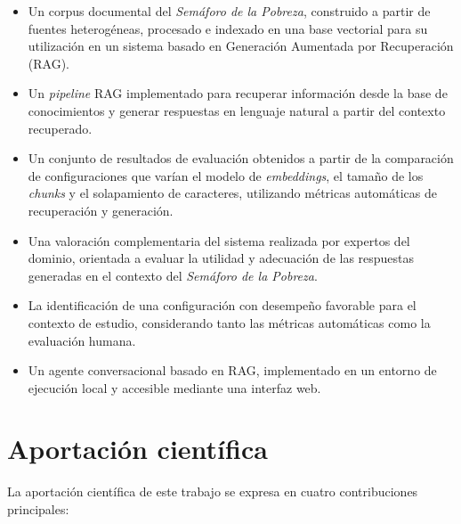 \documentclass{article}
\begin{document}
\begin{itemize}

\item Un corpus documental del \textit{Semáforo de la Pobreza}, construido a partir de fuentes heterogéneas, procesado e indexado en una base vectorial para su utilización en un sistema basado en Generación Aumentada por Recuperación (RAG).

\item Un \textit{pipeline} RAG implementado para recuperar información desde la base de conocimientos y generar respuestas en lenguaje natural a partir del contexto recuperado.

\item Un conjunto de resultados de evaluación obtenidos a partir de la comparación de configuraciones que varían el modelo de \textit{embeddings}, el tamaño de los \textit{chunks} y el solapamiento de caracteres, utilizando métricas automáticas de recuperación y generación.

\item Una valoración complementaria del sistema realizada por expertos del dominio, orientada a evaluar la utilidad y adecuación de las respuestas generadas en el contexto del \textit{Semáforo de la Pobreza}.

\item La identificación de una configuración con desempeño favorable para el contexto de estudio, considerando tanto las métricas automáticas como la evaluación humana.

\item Un agente conversacional basado en RAG, implementado en un entorno de ejecución local y accesible mediante una interfaz web.

\end{itemize}

\section{Aportación científica}

La aportación científica de este trabajo se expresa en cuatro contribuciones principales:
\end{document}
